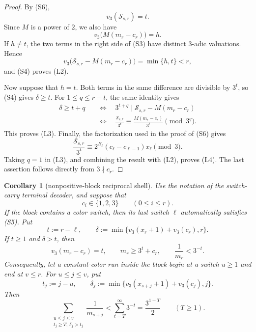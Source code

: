 \documentclass[11pt]{article}
\newtheorem{corollary}[theorem]{Corollary}
\begin{document}
\begin{proof}
By (S6),
\[
  v_3(\mathscr S_{s,r})=t.
  \tag{L5}
\]
Since $M$ is a power of $2$, we also have
\[
  v_3\bigl(M(m_r-c_r)\bigr)=h.
  \tag{L6}
\]
If $h\neq t$, the two terms in the right side of (S3) have distinct
$3$-adic valuations.  Hence
\[
  v_3\bigl(\mathscr S_{s,r}-M(m_r-c_r)\bigr)=\min\{h,t\}<r,
\]
and (S4) proves (L2).

Now suppose that $h=t$.  Both terms in the same difference are divisible
by $3^t$, so (S4) gives $\delta\geq t$.  For $1\leq q\leq r-t$, the same
identity gives
\[
\begin{aligned}
  \delta\geq t+q
  &\quad\Longleftrightarrow\quad
  3^{t+q}\mid
  \mathscr S_{s,r}-M(m_r-c_r)\\
  &\quad\Longleftrightarrow\quad
  \frac{\mathscr S_{s,r}}{3^t}
  \equiv
  \frac{M(m_r-c_r)}{3^t}
  \pmod {3^q}.
\end{aligned}
\]
This proves (L3).  Finally, the factorization used in the proof of (S6)
gives
\[
  \frac{\mathscr S_{s,r}}{3^t}
  \equiv
  2^{B_\ell}(c_\ell-c_{\ell-1})x_\ell
  \pmod3.
\]
Taking $q=1$ in (L3), and combining the result with (L2), proves (L4).
The last assertion follows directly from $3\nmid c_r$.
\end{proof}

\begin{corollary}[nonpositive-block reciprocal shell]
Use the notation of the switch-carry terminal decoder, and suppose that
\[
  c_i\in\{1,2,3\}
  \qquad(0\leq i\leq r).
  \tag{N1}
\]
If the block contains a color switch, then its last switch $\ell$
automatically satisfies (S5).  Put
\[
  t:=r-\ell,
  \qquad
  \delta:=\min\{v_3(x_r+1)+v_3(c_r),r\}.
  \tag{N2}
\]
If $t\geq1$ and $\delta>t$, then
\[
\boxed{
  v_3(m_r-c_r)=t,
  \qquad
  m_r\geq3^t+c_r,
  \qquad
  \frac1{m_r}<3^{-t}.}
\tag{N3}
\]
Consequently, let a constant-color run inside the block begin at a switch
$u\geq1$ and end at $v\leq r$.  For $u\leq j\leq v$, put
\[
  t_j:=j-u,
  \qquad
  \delta_j:=\min\{v_3(x_{s+j}+1)+v_3(c_j),j\}.
\]
Then
\[
\boxed{
  \sum_{\substack{u\leq j\leq v\\t_j\geq T,\ \delta_j>t_j}}
  \frac1{m_{s+j}}
  <\sum_{t=T}^{\infty}3^{-t}
  =\frac{3^{1-T}}2
  \qquad(T\geq1).}
\tag{N4}
\]
\end{corollary}
\end{document}
